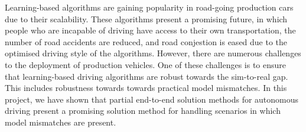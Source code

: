 Learning-based algorithms are gaining popularity in road-going production cars due to their scalability.
These algorithms present a promising future, in which people who are incapable of driving have access to their own transportation, 
the number of road accidents are reduced, and road conjestion is eased due to the optimised driving style of the algorithms.
However, there are numerous challenges to the deployment of production vehicles.
One of these challenges is to ensure that learning-based driving algorithms are robust towards the sim-to-real gap.
This includes robustness towards towards practical model mismatches.
In this project, we have shown that partial end-to-end solution methods for autonomous driving present a promising solution method for handling scenarios in which model mismatches are present.

